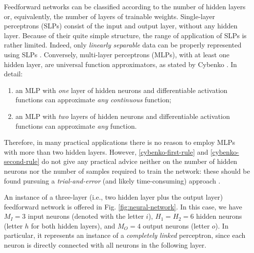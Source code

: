 \documentclass{elsarticle}
\numberwithin{equation}{section}
\theoremstyle{theorem}
\theoremstyle{definition}
\theoremstyle{remark}
\theoremstyle{proposition}
\numberwithin{figure}{section}
\begin{document}
		Feedforward networks can be classified according to the number of hidden layers or, equivalently, the number of layers of trainable weights. Single-layer perceptrons (SLPs) consist of the input and output layer, without any hidden layer. Because of their quite simple structure, the range of application of SLPs is rather limited. Indeed, only \emph{linearly separable} data can be properly represented using SLPs \cite{Kri07}. Conversely, multi-layer perceptrons (MLPs), with at least one hidden layer, are universal function approximators, as stated by Cybenko \cite{Cyb88, Cyb89}. In detail:
		\begin{enumerate}[label=(\roman*)]
			\item an MLP with \emph{one} layer of hidden neurons and differentiable activation functions can approximate \emph{any continuous} function; %
			\label{cybenko-first-rule}
			\item an MLP with \emph{two} layers of hidden neurons and differentiable activation functions can approximate \emph{any} function. %
			\label{cybenko-second-rule}
		\end{enumerate}
		Therefore, in many practical applications there is no reason to employ MLPs with more than two hidden layers. However, \ref{cybenko-first-rule} and \ref{cybenko-second-rule} do not give any practical advice neither on the number of hidden neurons nor the number of samples required to train the network: these should be found pursuing a \emph{trial-and-error} (and likely time-consuming) approach \cite{Hag14}.
		
		An instance of a three-layer (i.e., two hidden layer plus the output layer) feedforward network is offered in Fig. \ref{fig:neural-network}. In this case, we have $M_I = 3$ input neurons (denoted with the letter $i$), $H_1 = H_2 = 6$ hidden neurons (letter $h$ for both hidden layers), and $M_O = 4$ output neurons (letter $o$). In particular, it represents an instance of a \emph{completely linked} perceptron, since each neuron is directly connected with all neurons in the following layer.
				
\end{document}
